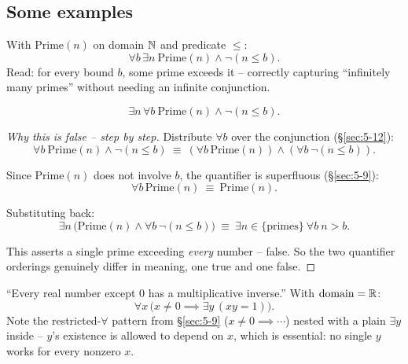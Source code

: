 \documentclass[11pt]{article}
\begin{document}
\subsection{Some examples}
\label{sec:5-15}

\begin{example}
With $\mathrm{Prime}(n)$ on domain $\mathbb{N}$ and predicate $\le$:
\[
\forall b\, \exists n\ \mathrm{Prime}(n) \wedge \neg(n \le b).
\]
Read: for every bound $b$, some prime exceeds it -- correctly capturing ``infinitely many primes'' without needing an infinite conjunction.
\end{example}

\begin{example}
\[
\exists n\, \forall b\ \mathrm{Prime}(n) \wedge \neg(n \le b).
\]
\end{example}
\begin{proof}[Why this is false -- step by step]
Distribute $\forall b$ over the conjunction (\S\ref{sec:5-12}):
\[
\forall b\ \mathrm{Prime}(n) \wedge \neg(n\le b) \ \equiv\ (\forall b\, \mathrm{Prime}(n)) \wedge (\forall b\, \neg(n\le b)).
\]

Since $\mathrm{Prime}(n)$ does not involve $b$, the quantifier is superfluous (\S\ref{sec:5-9}):
\[
\forall b\, \mathrm{Prime}(n) \ \equiv\ \mathrm{Prime}(n).
\]

Substituting back:
\[
\exists n\,\big(\mathrm{Prime}(n) \wedge \forall b\,\neg(n\le b)\big) \ \equiv\ \exists n\in\{\text{primes}\}\ \forall b\ n>b.
\]

This asserts a single prime exceeding \emph{every} number -- false. So the two quantifier orderings genuinely differ in meaning, one true and one false.
\end{proof}

\bigskip
\begin{example}
``Every real number except $0$ has a multiplicative inverse.'' With $\mathrm{domain}=\mathbb{R}$:
\[
\forall x\,\big(x\neq 0 \implies \exists y\, (xy=1)\big).
\]
Note the restricted-$\forall$ pattern from \S\ref{sec:5-9} ($x\neq0 \implies \cdots$) nested with a plain $\exists y$ inside -- $y$'s existence is allowed to depend on $x$, which is essential: no single $y$ works for every nonzero $x$.
\end{example}
\end{document}
